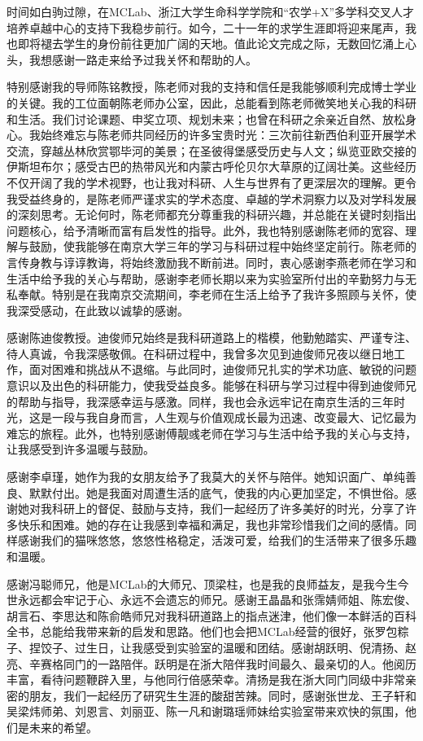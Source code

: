 \cleardoublepage
{}

时间如白驹过隙，在MCLab、浙江大学生命科学学院和“农学+X”多学科交叉人才培养卓越中心的支持下我稳步前行。如今，二十一年的求学生涯即将迎来尾声，我也即将褪去学生的身份前往更加广阔的天地。值此论文完成之际，无数回忆涌上心头，我想感谢一路走来给予过我关怀和帮助的人。

特别感谢我的导师陈铭教授，陈老师对我的支持和信任是我能够顺利完成博士学业的关键。我的工位面朝陈老师办公室，因此，总能看到陈老师微笑地关心我的科研和生活。我们讨论课题、申奖立项、规划未来；也曾在科研之余亲近自然、放松身心。我始终难忘与陈老师共同经历的许多宝贵时光：三次前往新西伯利亚开展学术交流，穿越丛林欣赏鄂毕河的美景；在圣彼得堡感受历史与人文；纵览亚欧交接的伊斯坦布尔；感受古巴的热带风光和内蒙古呼伦贝尔大草原的辽阔壮美。这些经历不仅开阔了我的学术视野，也让我对科研、人生与世界有了更深层次的理解。更令我受益终身的，是陈老师严谨求实的学术态度、卓越的学术洞察力以及对学科发展的深刻思考。无论何时，陈老师都充分尊重我的科研兴趣，并总能在关键时刻指出问题核心，给予清晰而富有启发性的指导。此外，我也特别感谢陈老师的宽容、理解与鼓励，使我能够在南京大学三年的学习与科研过程中始终坚定前行。陈老师的言传身教与谆谆教诲，将始终激励我不断前进。同时，衷心感谢李燕老师在学习和生活中给予我的关心与帮助，感谢李老师长期以来为实验室所付出的辛勤努力与无私奉献。特别是在我南京交流期间，李老师在生活上给予了我许多照顾与关怀，使我深受感动，在此致以诚挚的感谢。

感谢陈迪俊教授。迪俊师兄始终是我科研道路上的楷模，他勤勉踏实、严谨专注、待人真诚，令我深感敬佩。在科研过程中，我曾多次见到迪俊师兄夜以继日地工作，面对困难和挑战从不退缩。与此同时，迪俊师兄扎实的学术功底、敏锐的问题意识以及出色的科研能力，使我受益良多。能够在科研与学习过程中得到迪俊师兄的帮助与指导，我深感幸运与感激。同样，我也会永远牢记在南京生活的三年时光，这是一段与我自身而言，人生观与价值观成长最为迅速、改变最大、记忆最为难忘的旅程。此外，也特别感谢傅靓彧老师在学习与生活中给予我的关心与支持，让我感受到许多温暖与鼓励。

感谢李卓瑾，她作为我的女朋友给予了我莫大的关怀与陪伴。她知识面广、单纯善良、默默付出。她是我面对周遭生活的底气，使我的内心更加坚定，不惧世俗。感谢她对我科研上的督促、鼓励与支持，我们一起经历了许多美好的时光，分享了许多快乐和困难。她的存在让我感到幸福和满足，我也非常珍惜我们之间的感情。同样感谢我们的猫咪悠悠，悠悠性格稳定，活泼可爱，给我们的生活带来了很多乐趣和温暖。

感谢冯聪师兄，他是MCLab的大师兄、顶梁柱，也是我的良师益友，是我今生今世永远都会牢记于心、永远不会遗忘的师兄。感谢王晶晶和张霈婧师姐、陈宏俊、胡言石、李思达和陈俞皓师兄对我科研道路上的指点迷津，他们像一本鲜活的百科全书，总能给我带来新的启发和思路。他们也会把MCLab经营的很好，张罗包粽子、捏饺子、过生日，让我感受到实验室的温暖和团结。感谢胡跃明、倪清扬、赵亮、辛赛格同门的一路陪伴。跃明是在浙大陪伴我时间最久、最亲切的人。他阅历丰富，看待问题鞭辟入里，与他同行倍感荣幸。清扬是我在浙大同门同级中非常亲密的朋友，我们一起经历了研究生生涯的酸甜苦辣。同时，感谢张世龙、王子轩和吴梁炜师弟、刘恩言、刘丽亚、陈一凡和谢璐瑶师妹给实验室带来欢快的氛围，他们是未来的希望。

